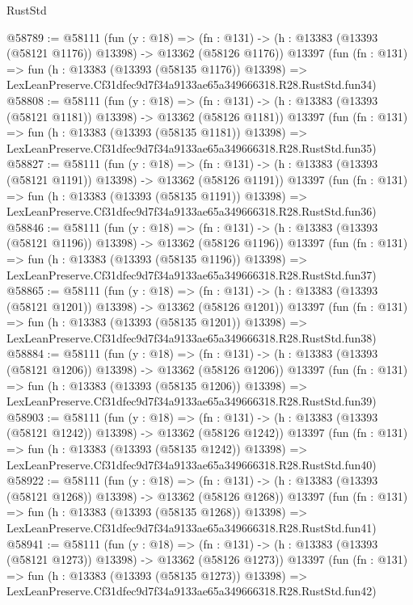 \begin{lexlean}{RustStd}
\begin{coremodule}
@58789 := @58111
    (fun (y : @18) =>
    (fn : @131) -> (h : @13383 (@13393 (@58121 @1176)) @13398) -> @13362 (@58126 @1176))
    @13397
    (fun (fn : @131) =>
    fun (h : @13383 (@13393 (@58135 @1176)) @13398) =>
    LexLeanPreserve.Cf31dfec9d7f34a9133ae65a349666318.R28.RustStd.fun34)
@58808 := @58111
    (fun (y : @18) =>
    (fn : @131) -> (h : @13383 (@13393 (@58121 @1181)) @13398) -> @13362 (@58126 @1181))
    @13397
    (fun (fn : @131) =>
    fun (h : @13383 (@13393 (@58135 @1181)) @13398) =>
    LexLeanPreserve.Cf31dfec9d7f34a9133ae65a349666318.R28.RustStd.fun35)
@58827 := @58111
    (fun (y : @18) =>
    (fn : @131) -> (h : @13383 (@13393 (@58121 @1191)) @13398) -> @13362 (@58126 @1191))
    @13397
    (fun (fn : @131) =>
    fun (h : @13383 (@13393 (@58135 @1191)) @13398) =>
    LexLeanPreserve.Cf31dfec9d7f34a9133ae65a349666318.R28.RustStd.fun36)
@58846 := @58111
    (fun (y : @18) =>
    (fn : @131) -> (h : @13383 (@13393 (@58121 @1196)) @13398) -> @13362 (@58126 @1196))
    @13397
    (fun (fn : @131) =>
    fun (h : @13383 (@13393 (@58135 @1196)) @13398) =>
    LexLeanPreserve.Cf31dfec9d7f34a9133ae65a349666318.R28.RustStd.fun37)
@58865 := @58111
    (fun (y : @18) =>
    (fn : @131) -> (h : @13383 (@13393 (@58121 @1201)) @13398) -> @13362 (@58126 @1201))
    @13397
    (fun (fn : @131) =>
    fun (h : @13383 (@13393 (@58135 @1201)) @13398) =>
    LexLeanPreserve.Cf31dfec9d7f34a9133ae65a349666318.R28.RustStd.fun38)
@58884 := @58111
    (fun (y : @18) =>
    (fn : @131) -> (h : @13383 (@13393 (@58121 @1206)) @13398) -> @13362 (@58126 @1206))
    @13397
    (fun (fn : @131) =>
    fun (h : @13383 (@13393 (@58135 @1206)) @13398) =>
    LexLeanPreserve.Cf31dfec9d7f34a9133ae65a349666318.R28.RustStd.fun39)
@58903 := @58111
    (fun (y : @18) =>
    (fn : @131) -> (h : @13383 (@13393 (@58121 @1242)) @13398) -> @13362 (@58126 @1242))
    @13397
    (fun (fn : @131) =>
    fun (h : @13383 (@13393 (@58135 @1242)) @13398) =>
    LexLeanPreserve.Cf31dfec9d7f34a9133ae65a349666318.R28.RustStd.fun40)
@58922 := @58111
    (fun (y : @18) =>
    (fn : @131) -> (h : @13383 (@13393 (@58121 @1268)) @13398) -> @13362 (@58126 @1268))
    @13397
    (fun (fn : @131) =>
    fun (h : @13383 (@13393 (@58135 @1268)) @13398) =>
    LexLeanPreserve.Cf31dfec9d7f34a9133ae65a349666318.R28.RustStd.fun41)
@58941 := @58111
    (fun (y : @18) =>
    (fn : @131) -> (h : @13383 (@13393 (@58121 @1273)) @13398) -> @13362 (@58126 @1273))
    @13397
    (fun (fn : @131) =>
    fun (h : @13383 (@13393 (@58135 @1273)) @13398) =>
    LexLeanPreserve.Cf31dfec9d7f34a9133ae65a349666318.R28.RustStd.fun42)

\end{coremodule}
\end{lexlean}
